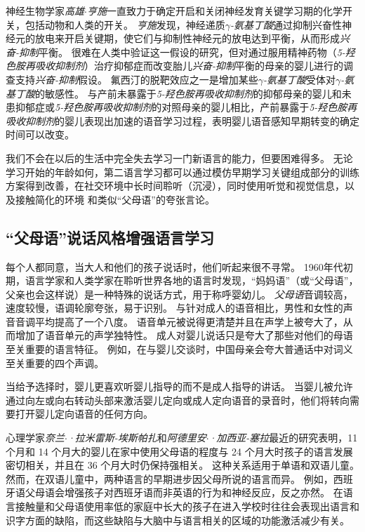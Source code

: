 神经生物学家\textit{高雄$\cdot$亨施}一直致力于确定开启和关闭神经发育关键学习期的化学开关，包括动物和人类的开关。
\textit{亨施}发现，神经递质\textit{$\gamma$-氨基丁酸}通过抑制兴奋性神经元的放电来开启关键期，使它们与抑制性神经元的放电达到平衡，从而形成\textit{兴奋-抑制}平衡。
很难在人类中验证这一假设的研究，但对通过服用精神药物（\textit{5-羟色胺再吸收抑制剂}）治疗抑郁症而改变胎儿\textit{兴奋-抑制}平衡的母亲的婴儿进行的调查支持\textit{兴奋-抑制}假设。
氟西汀的脱靶效应之一是增加某些\textit{$\gamma$-氨基丁酸}受体对\textit{$\gamma$-氨基丁酸}的敏感性。
与产前未暴露于\textit{5-羟色胺再吸收抑制剂}的抑郁母亲的婴儿和未患抑郁症或\textit{5-羟色胺再吸收抑制剂}的对照母亲的婴儿相比，产前暴露于\textit{5-羟色胺再吸收抑制剂}的婴儿表现出加速的语音学习过程，表明婴儿语音感知早期转变的确定时间可以改变。


我们不会在以后的生活中完全失去学习一门新语言的能力，但要困难得多。
无论学习开始的年龄如何，第二语言学习都可以通过模仿早期学习关键组成部分的训练方案得到改善，在社交环境中长时间聆听（沉浸），同时使用听觉和视觉信息，以及接触简化的环境 和类似“父母语”的夸张言论。



\subsection{“父母语”说话风格增强语言学习}

每个人都同意，当大人和他们的孩子说话时，他们听起来很不寻常。
1960年代初期，语言学家和人类学家在聆听世界各地的语言时发现，“妈妈语”（或“父母语”，父亲也会这样说）是一种特殊的说话方式，用于称呼婴幼儿。
\textit{父母语}音调较高，速度较慢，语调轮廓夸张，易于识别。
与针对成人的语音相比，男性和女性的声音音调平均提高了一个八度。
语音单元被说得更清楚并且在声学上被夸大了，从而增加了语音单元的声学独特性。
成人对婴儿说话只是夸大了那些对他们的母语至关重要的语言特征。
例如，在与婴儿交谈时，中国母亲会夸大普通话中对词义至关重要的四个声调。


当给予选择时，婴儿更喜欢听婴儿指导的而不是成人指导的讲话。
当婴儿被允许通过向左或向右转动头部来激活婴儿定向或成人定向语音的录音时，他们将转向需要打开婴儿定向语音的任何方向。


心理学家\textit{奈兰$\cdot$·拉米雷斯-埃斯帕扎}和\textit{阿德里安$\cdot$·加西亚-塞拉}最近的研究表明，11 个月和 14 个月大的婴儿在家中使用父母语的程度与 24 个月大时孩子的语言发展密切相关，并且在 36 个月大时仍保持强相关。
这种关系适用于单语和双语儿童。
然而，在双语儿童中，两种语言的早期进步因父母所说的语言而异。
例如，西班牙语父母语会增强孩子对西班牙语而非英语的行为和神经反应，反之亦然。
在语言接触量和父母语使用率低的家庭中长大的孩子在进入学校时往往会表现出语言和识字方面的缺陷，而这些缺陷与大脑中与语言相关的区域的功能激活减少有关。



